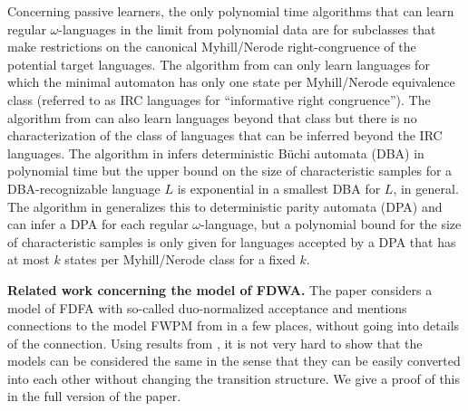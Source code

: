 \documentclass[a4paper,USenglish,cleveref,autoref,thm-restate]{lipics-v2021}
\begin{document}
Concerning passive learners, the only polynomial time algorithms that can learn regular $\omega$-languages in the limit from polynomial data are for subclasses that make restrictions on the canonical Myhill/Nerode right-congruence of the potential target languages. The algorithm from \cite{AngluinFS20} can only learn languages for which the minimal automaton has only one state per Myhill/Nerode equivalence class (referred to as IRC languages for ``informative right congruence''). The algorithm from \cite{BohnL21} can also learn languages beyond that class but there is no characterization of the class of languages that can be inferred beyond the IRC languages. The algorithm in \cite{BohnL22} infers deterministic Büchi automata (DBA) in polynomial time but the upper bound on the size of characteristic samples for a DBA-recognizable language $L$ is exponential in a smallest DBA for $L$, in general. The algorithm in \cite{BohnL24} generalizes this to deterministic parity automata (DPA) and can infer a DPA for each regular $\omega$-language, but a polynomial bound for the size of characteristic samples is only given for languages accepted by a  DPA that has at most $k$ states per Myhill/Nerode class for a fixed $k$.

\smallskip \noindent
\textbf{Related work concerning the model of FDWA.}
The paper \cite{FismanGZ24} considers a model of FDFA with so-called duo-normalized acceptance and mentions connections to the model FWPM from \cite{BohnL24} in a few places, without going into details of the connection.
Using results from \cite{BohnL24}, it is not very hard to show that the models can be considered the same in the sense that they can be easily converted into each other without changing the transition structure. We give a proof of this in the full version of the paper.
\end{document}

